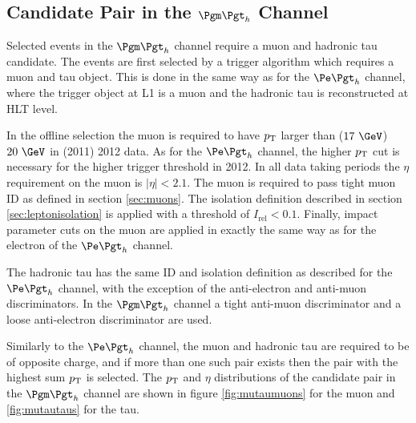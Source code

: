 \subsection{Candidate Pair in the $\mutau$ Channel}

Selected events in the $\mutau$ channel require a muon and hadronic tau
candidate. The events are first selected by a trigger algorithm which requires
a muon and tau object. This is done in the same way as for the $\etau$ channel,
where the trigger object at \ac{L1} is a muon and the hadronic tau is
reconstructed at \ac{HLT} level.

In the offline selection the muon is required to have $p_{\mathrm{T}}$ larger than ($17~\GeV$)
$20~\GeV$ in (2011) 2012 data. As for the $\etau$ channel, the higher $p_{\mathrm{T}}$ cut is necessary for the
higher trigger threshold in 2012. In all data taking periods the $\eta$ requirement
on the muon is $|\eta| < 2.1$. The muon is required to pass tight muon ID as
defined in section \ref{sec:muons}. The isolation definition described in 
section \ref{sec:leptonisolation} is
applied with a threshold of $I_{\text{rel}} < 0.1$. Finally, impact parameter cuts on the muon are
applied in exactly the same way as for the electron of the $\etau$ channel.

The hadronic tau has the same ID and isolation definition as described for the $\etau$
channel, with the exception of the anti-electron and anti-muon discriminators.
In the $\mutau$ channel a tight anti-muon discriminator and a loose
anti-electron discriminator are used. 

Similarly to the $\etau$ channel, the muon and hadronic tau are required to be of 
opposite charge, and if more than one such pair exists then the pair with the highest sum $p_{\mathrm{T}}$
is selected. The $p_{\mathrm{T}}$ and $\eta$ distributions of the candidate pair in the
$\mutau$ channel are shown in figure \ref{fig:mutaumuons} for the muon and
\ref{fig:mutautaus} for the tau. 


